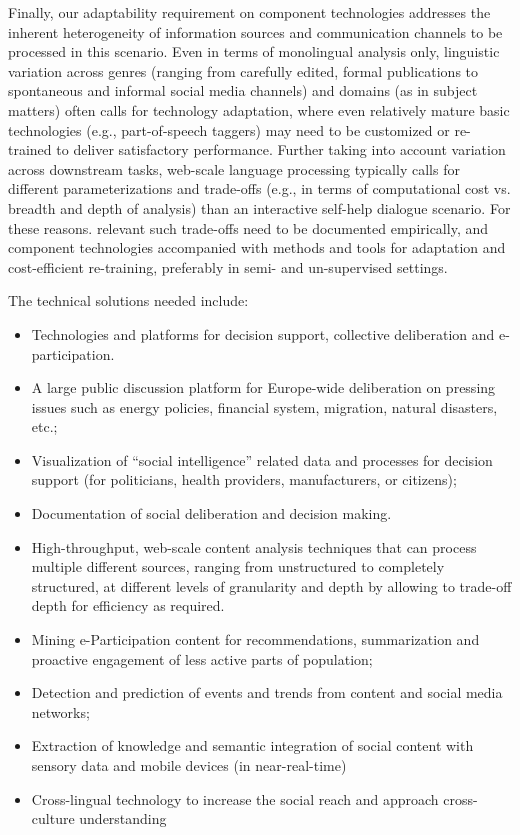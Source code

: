 \documentclass[10pt, plain]{../../metanetpaper}
\begin{document}
\begin{multicols}{2}
Finally, our adaptability requirement on component technologies addresses the inherent heterogeneity of information sources and communication channels to be processed in this scenario.  Even in terms of monolingual analysis only, linguistic variation across genres (ranging from carefully edited, formal publications to spontaneous and informal social media channels) and domains (as in subject matters) often calls for technology adaptation, where even relatively mature basic technologies (e.g., part-of-speech taggers) may need to be customized or re-trained to deliver satisfactory performance. Further taking into account variation across downstream tasks, web-scale language processing typically calls for different parameterizations and trade-offs (e.g., in terms of computational cost vs. breadth and depth of analysis) than an interactive self-help dialogue scenario. For these reasons. relevant such trade-offs need to be documented empirically, and component technologies accompanied with methods and tools for adaptation and cost-efficient re-training, preferably in semi- and un-supervised settings.
 
The technical solutions needed include:

\begin{itemize}
\item Technologies and platforms for decision support, collective deliberation and e-participation.
\item A large public discussion platform for Europe-wide deliberation on pressing issues such as energy policies, financial system, migration, natural disasters, etc.;
\item Visualization of “social intelligence” related data and processes for decision support (for politicians, health providers, manufacturers, or citizens);
\item Documentation of social deliberation and decision making.
\item High-throughput, web-scale content analysis techniques that can process multiple different sources, ranging from unstructured to completely structured, at different levels of granularity and depth by allowing to trade-off depth for efficiency as required.
\item Mining e-Participation content for recommendations, summarization and proactive engagement of less active parts of population;
\item Detection and prediction of events and trends from content and social media networks;
\item Extraction of knowledge and semantic integration of social content with sensory data and mobile devices (in near-real-time)
\item Cross-lingual technology to increase the social reach and approach cross-culture understanding
\end{itemize}


\end{multicols}
\end{document}
